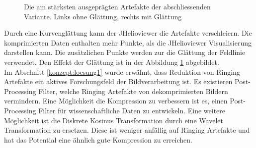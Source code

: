 \begin{figure}[!htbp]
	\center
	\caption{Die am stärksten ausgeprägten Artefakte der abschliessenden Variante. Links ohne Glättung, rechts mit Glättung}
	\label{resultate:loesung1:dct:final:artefakte}
\end{figure}
Durch eine Kurvenglättung kann der JHelioviewer die Artefakte verschleiern. Die komprimierten Daten enthalten mehr Punkte, als die JHelioviewer Visualisierung darstellen kann. Die zusätzlichen Punkte werden zur die Glättung der Feldlinie verwendet. Den Effekt der Glättung ist in der Abbildung \ref{resultate:loesung1:dct:final:artefakte} abgebildet.\\
Im Abschnitt \ref{konzept:loesung1} wurde erwähnt, dass Reduktion von Ringing Artefakte ein aktives Forschungsfeld der Bildverarbeitung ist. Es existieren Post-Processing Filter, welche Ringing Artefakte von dekomprimierten Bildern vermindern. Eine Möglichkeit die Kompression zu verbessern ist es, einen Post-Processing Filter für wissenschaftliche Daten zu entwickeln. Eine weitere Möglichkeit ist die Diskrete Kosinus Transformation durch eine Wavelet Transformation zu ersetzen. Diese ist weniger anfällig auf Ringing Artefakte und hat das Potential eine ähnlich gute Kompression zu erreichen.

